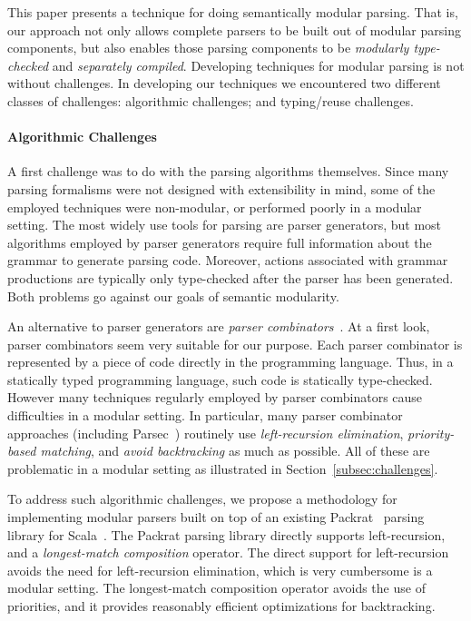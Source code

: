 This paper presents a technique for doing semantically
modular parsing.  That is, our approach not only allows complete
parsers to be built out of modular parsing components, but also enables
those parsing components to be \emph{modularly type-checked} and
\emph{separately compiled}. Developing techniques for modular parsing
is not without challenges. In developing our techniques we encountered
two different classes of challenges: algorithmic challenges; and
typing/reuse challenges.

\paragraph{Algorithmic Challenges} A first challenge was to do with
the parsing algorithms themselves. Since many parsing formalisms
were not designed with extensibility in mind, some of the employed
techniques were non-modular, or performed poorly in a modular
setting.  The most widely use tools for parsing are parser
generators, but most algorithms employed by parser generators
require full information about the grammar to generate parsing
code. Moreover, actions associated with grammar productions are
typically only type-checked after the parser has been
generated. Both problems go against our goals of semantic
modularity.

An alternative to parser generators are \emph{parser
  combinators}~\cite{burge1975,Wadler1985}.  At a first look, parser
combinators seem very suitable for our purpose. Each parser
combinator is represented by a piece of code directly in the
programming language. Thus, in a statically typed programming
language, such code is statically type-checked.  However many
techniques regularly employed by parser combinators cause difficulties in a
modular setting. In particular, many parser combinator approaches
(including Parsec~\cite{Leijen2001}) routinely use \emph{left-recursion
  elimination}, \emph{priority-based matching}, and \emph{avoid
  backtracking} as much as possible. All of these are problematic in
a modular setting as illustrated in Section~\ref{subsec:challenges}.

To address such algorithmic challenges, we propose a methodology
for implementing modular parsers built on top of an
existing Packrat~\cite{Ford2002} parsing library for Scala~\cite{odersky2004overview}. The Packrat parsing library
directly supports left-recursion, and a \emph{longest-match
  composition} operator. The direct support for left-recursion
avoids the need for left-recursion elimination, which is very
cumbersome is a modular setting. The longest-match composition
operator avoids the use of priorities, and it provides reasonably
efficient optimizations for backtracking.

